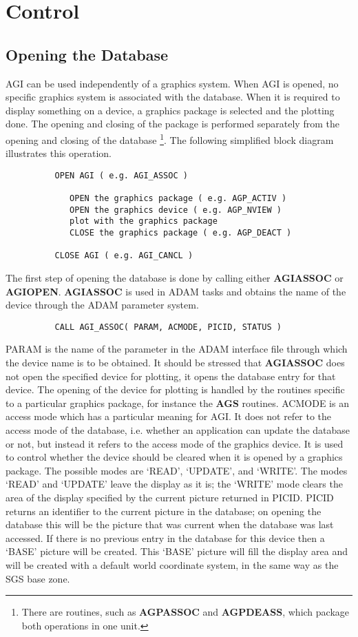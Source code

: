 \documentclass[twoside,11pt]{article}
\newcommand{\htmlref}[2]{#1}
\renewcommand{\_}{\texttt{\symbol{95}}}
\begin{document}
\section {Control}

\subsection{Opening the Database}

AGI can be used independently of a graphics system. When AGI is opened,
no specific graphics system is associated with the database.
When it is required to display something on a device, a graphics package
is selected and the plotting done. The opening and closing of the package
is performed separately from the opening and closing of the database
\footnote{There are routines, such as {\bf AGP\_ASSOC} and {\bf AGP\_DEASS},
which package both operations in one unit.}.
The following simplified block diagram illustrates this operation.
\begin{verbatim}
          OPEN AGI ( e.g. AGI_ASSOC )

             OPEN the graphics package ( e.g. AGP_ACTIV )
             OPEN the graphics device ( e.g. AGP_NVIEW )
             plot with the graphics package
             CLOSE the graphics package ( e.g. AGP_DEACT )

          CLOSE AGI ( e.g. AGI_CANCL )
\end{verbatim}

The first step of opening the database is done by calling either
\htmlref{{\bf AGI\_ASSOC}}{AGI_ASSOC} or 
\htmlref{{\bf AGI\_OPEN}}{AGI_OPEN}. 
{\bf AGI\_ASSOC} is used in ADAM
tasks and obtains the name of the device through the ADAM parameter
system.
\begin{verbatim}
          CALL AGI_ASSOC( PARAM, ACMODE, PICID, STATUS )
\end{verbatim}
PARAM is the name of the parameter in the ADAM interface file through
which the device name is to be obtained. It should be stressed that
{\bf AGI\_ASSOC} does not open the specified device for plotting, it 
opens the database entry for that device. The opening of the device for
plotting is handled by the routines specific to a particular graphics
package, for instance the {\bf AGS\_} routines.
ACMODE is an access mode which has a particular meaning for AGI. It does
not refer to the access mode of the database, i.e. whether an application
can update the database or not, but instead it refers to the access mode
of the graphics device. It is used to control whether the device should
be cleared when it is opened by a graphics package. The possible modes
are `READ', `UPDATE', and `WRITE'. The modes `READ' and `UPDATE' leave
the display as it is; the `WRITE' mode clears the area of the display
specified by the current picture returned in PICID. PICID returns an
identifier to the current picture in the database; on opening the
database this will be the picture that was current when the database was
last accessed. If there is no previous entry in the database for this
device then a `BASE' picture will be created.
This `BASE' picture will fill the display area and will be created with a
default world coordinate system, in the same way as the SGS base zone.
\end{document}

